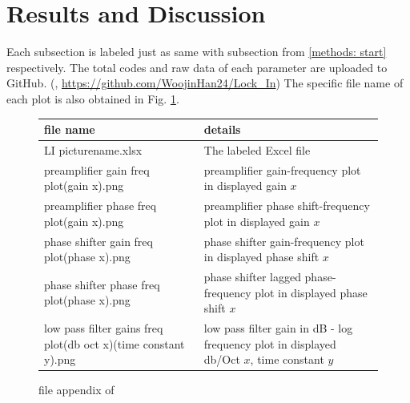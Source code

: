 \documentclass{article}
\begin{document}
\section{Results and Discussion}
\label{results: start}
 Each subsection is labeled just as same with subsection from \ref{methods: start} respectively.
 The total codes and raw data of each parameter are uploaded to GitHub.
 (\cite{github}, \url{https://github.com/WoojinHan24/Lock_In})
 The specific file name of each plot is also obtained in Fig. \ref{fig: file_appendix}.

\begin{figure}[H]
    \begin{tabular}{  m{6.2cm} | m{7.7cm}  } 

      file name& details \\ 
      \hline
      \hline
        LI picturename.xlsx & The labeled Excel file\\
      \hline
        preamplifier gain freq plot(gain x).png & preamplifier gain-frequency plot in displayed gain $x$\\
      \hline
        preamplifier phase freq plot(gain x).png & preamplifier phase shift-frequency plot in displayed gain $x$\\
      \hline
        phase shifter gain freq plot(phase x).png & phase shifter gain-frequency plot in displayed phase shift $x$\\
      \hline
        phase shifter phase freq plot(phase x).png & phase shifter lagged phase-frequency plot in displayed phase shift $x$\\
      \hline
        low pass filter gains freq plot(db oct x)(time constant y).png & low pass filter gain in dB - log frequency plot in displayed db/Oct $x$, time constant $y$
        
    \end{tabular}
    \caption{file appendix of \cite{github}}
    \label{fig: file_appendix}
\end{figure}
\end{document}
